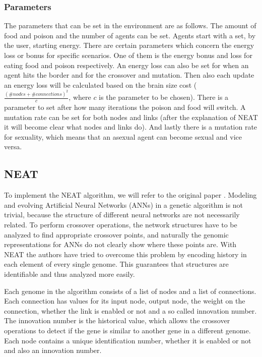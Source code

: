 \subsubsection{Parameters}

The parameters that can be set in the environment are as follows. 
The amount of food and poison and the number of agents can be set.
Agents start with a set, by the user, starting energy.
There are certain parameters which concern the energy loss or bonus for specific scenarios.
One of them is the energy bonus and loss for eating food and poison respectively.
An energy loss can also be set for when an agent hits the border and for the crossover and mutation.
Then also each update an energy loss will be calculated based on the brain size cost ($\frac{(\#nodes+\#connections)^2}{c}$, where $c$ is the parameter to be chosen).
There is a parameter to set after how many iterations the poison and food will switch.
A mutation rate can be set for both nodes and links (after the explanation of NEAT it will become clear what nodes and links do).
And lastly there is a mutation rate for sexuality, which means that an asexual agent can become sexual and vice versa.

\subsection{NEAT}

To implement the NEAT algorithm, we will refer to the original paper \cite{stanleyneat}.
Modeling and evolving Artificial Neural Networks (ANNs) in a genetic algorithm is not trivial, because the structure of different neural networks are not necessarily related.
To perform crossover operations, the network structures have to be analyzed to find appropriate crossover points, and naturally the genomic representations for ANNs do not clearly show where these points are.
With NEAT the authors have tried to overcome this problem by encoding history in each element of every single genome.
This guarantees that structures are identifiable and thus analyzed more easily.

Each genome in the algorithm consists of a list of nodes and a list of connections.
Each connection has values for its input node, output node, the weight on the connection, whether the link is enabled or not and a so called innovation number.
The innovation number is the historical value, which allows the crossover operations to detect if the gene is similar to another gene in a different genome.
Each node contains a unique identification number, whether it is enabled or not and also an innovation number.

